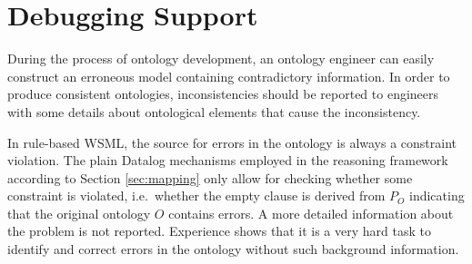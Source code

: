 \def\transdebug{\transtxt{debug}}
\def\pvotype{\predicate{\predsubtxt{v\_otype}}}
\def\pvmincard{\predicate{\predsubtxt{v\_mincard}}}
\def\pvmaxcard{\predicate{\predsubtxt{v\_maxcard}}}
\def\pvuser{\predicate{\predsubtxt{v\_user}}}
\def\axiomid{\ensuremath{Ax_{I\!D}}\xspace}
\def\debugaxioms{\ensuremath{P_{\smtxtit{debug}}}\xspace}

\section{Debugging Support\label{sec:debugging}}

During the process of ontology development, an ontology engineer
can easily construct an erroneous model containing contradictory
information. In order to produce consistent ontologies,
inconsistencies should be reported to engineers with some details
about ontological elements that cause the inconsistency.

In rule-based WSML, the source for errors in the ontology is always a constraint violation. The plain Datalog mechanisms employed in the reasoning
framework according to Section \ref{sec:mapping} only allow for
checking whether some constraint is violated, i.e.\ whether the
empty clause is derived from $P_O$ indicating that the original
ontology $O$ contains errors. A more detailed
information about the problem is not reported. Experience shows that it is a very hard task to identify and correct errors in the ontology without such background information.

